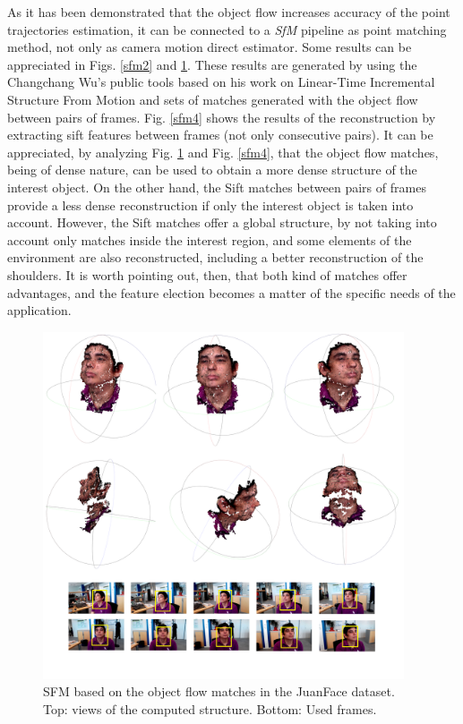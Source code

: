As it has been demonstrated that the object flow 
increases accuracy of the point trajectories estimation, it can be connected to a {\it SfM} 
pipeline as point matching method, not only as camera motion direct estimator. Some results can be appreciated in Figs. \ref{sfm2} and \ref{sfm3}. These results are generated 
by using the Changchang Wu's public tools based on his work on Linear-Time Incremental Structure From Motion \cite{c42} and sets of matches generated 
with the object flow between pairs of frames. Fig. \ref{sfm4} shows the results of the reconstruction by extracting sift features between frames (not only consecutive pairs). It can be 
appreciated, by analyzing  Fig. \ref{sfm3} and Fig. \ref{sfm4}, that the object flow matches, being of dense nature, can be used to obtain a more dense structure of the interest object. 
On the other hand, the Sift matches between pairs of frames provide a less dense reconstruction if only the interest object is taken into account. However, the Sift matches offer a global 
structure, by not taking into account only matches inside the interest region, and some elements of the environment are also reconstructed, including a  better reconstruction of the shoulders. 
It is worth pointing out, then, that both kind of matches offer advantages, and the feature election becomes a matter of the specific needs of the application. 
   
   \begin{figure}[tpbh]
      \centering
      \includegraphics[width=0.95\textwidth]{../images/SFM3_1.png}
      \caption{ SFM based on the object flow matches in the JuanFace dataset. Top: views of the computed structure. Bottom: Used frames. }
      \label{sfm3}
   \end{figure}


